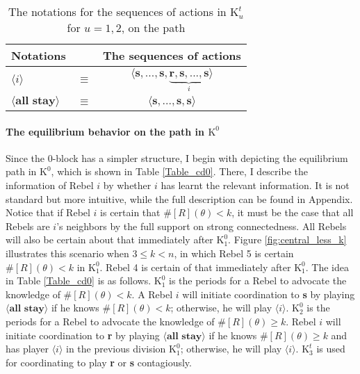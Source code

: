 \documentclass[12pt,letter]{article}
\newcommand{\Kappa}{\mathrm{K}}
\theoremstyle{definition}
\theoremstyle{remark}
\theoremstyle{claim}
\begin{document}
\begin{table}[!htbp]
\caption{The notations for the sequences of actions in $\Kappa^t_{u}$ for $u=1,2$, on the path}
\label{Table_msg_coordination}
\begin{center}
\begin{tabular}{l c c}
Notations & &The sequences of actions \\
\hline
\hline
$\langle i \rangle$ 				& $\equiv$ 			& $\langle \textbf{s},...,\textbf{s},\underbrace{\textbf{r},\textbf{s},...,\textbf{s}}_{i} \rangle$  \\
$\langle \textbf{all stay} \rangle$	 					& $\equiv$ 			& $\langle \textbf{s},...,\textbf{s},{\textbf{s}}\rangle$  \\
\hline
\end{tabular}
\end{center}
\end{table}


\paragraph{The equilibrium behavior on the path in $\Kappa^0$}
Since the $0$-block has a simpler structure, I begin with depicting the equilibrium path in $\Kappa^0$, which is shown in Table \ref{Table_cd0}. There, I describe the information of Rebel $i$ by whether $i$ has learnt the relevant information. It is not standard but more intuitive, while the full description can be found in Appendix. Notice that if Rebel $i$ is certain that $\#[R](\theta)<k$, it must be the case that all Rebels are $i$'s neighbors by the full support on strong connectedness. All Rebels will also be certain about that immediately after $\Kappa^0_{1}$. Figure \ref{fig:central_less_k} illustrates this scenario when $3\leq k <n$, in which Rebel 5 is certain $\#[R](\theta)<k$ in $\Kappa^0_1$. Rebel 4 is certain of that immediately after $\Kappa^0_1$. The idea in Table \ref{Table_cd0} is as follows. $\Kappa^0_1$ is the periods for a Rebel to advocate the knowledge of $\# [R](\theta)<k$. A Rebel $i$ will initiate coordination to \textbf{s} by playing $\langle \textbf{all stay} \rangle$ if he knows $\# [R](\theta)<k$; otherwise, he will play $\langle i \rangle$. $\Kappa^0_2$ is the periods for a Rebel to advocate the knowledge of $\# [R](\theta)\geq k$. Rebel $i$ will initiate coordination to \textbf{r} by playing $\langle \textbf{all stay} \rangle$ if he knows $\# [R](\theta)\geq k$ and has player $\langle i \rangle$ in the previous division $\Kappa^0_1$; otherwise, he will play $\langle i \rangle$. $\Kappa^t_3$ is used for coordinating to play \textbf{r} or \textbf{s} contagiously.
\end{document}
